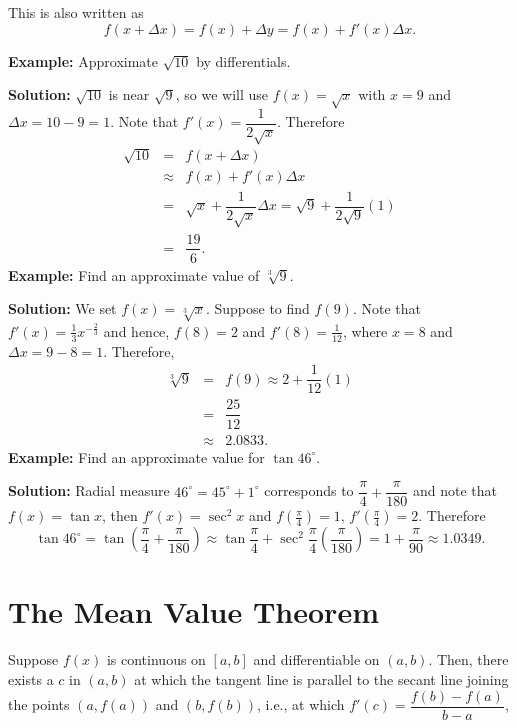 \documentclass[titlepage,a4paper,12pt]{report}
\begin{document}
\noindent This is also written as 
\begin{equation*}
f(x+\Delta x)=f(x)+\Delta y =f(x)+f'(x)\Delta x.
\end{equation*}

\noindent \textbf{Example:} Approximate $\sqrt{10}$ by differentials.

\noindent \textbf{Solution:} $\sqrt{10}$ is near $\sqrt{9}$, so we will use $f(x)=\sqrt{x}$ with $x=9$ and $\Delta x =10-9=1$. Note that $f'(x)=\dfrac{1}{2\sqrt{x}}$. Therefore
\begin{eqnarray*}
\sqrt{10} &=& f(x+\Delta x)\\
&\approx & f(x)+ f'(x)\Delta x\\
&=& \sqrt{x} +\dfrac{1}{2\sqrt{x}}\Delta x =\sqrt{9} +\dfrac{1}{2\sqrt{9}} (1)\\
&=& \dfrac{19}{6}.
\end{eqnarray*}
\noindent \textbf{Example:} Find an approximate value of $\sqrt[3]{9}$.

\noindent \textbf{Solution:} We set $f(x)=\sqrt[3]{x}$. Suppose to find $f(9)$. Note that $f'(x)=\frac{1}{3}x^{-\frac{2}{3}}$ and hence, $f(8)=2$ and $f'(8)=\frac{1}{12}$, where $x=8$ and $\Delta x =9-8=1$. Therefore, 
\begin{eqnarray*}
\sqrt[3]{9} &=& f(9) \approx 2+\dfrac{1}{12} (1)\\
&=& \dfrac{25}{12}\\
&\approx & 2.0833.
\end{eqnarray*}
 \noindent \textbf{Example:} Find an approximate value for $\tan 46^\circ$.
 
 \noindent \textbf{Solution:} Radial measure $46^\circ =45^\circ +1^\circ$ corresponds to $\dfrac{\pi}{4} +\dfrac{\pi}{180}$ and note that $f(x)=\tan x$, then $f'(x)=\sec ^2 x$ and $f(\frac{\pi}{4})=1, \, f'(\frac{\pi}{4})=2$. Therefore
 \begin{equation*}
 \tan 46^\circ = \tan \left(\dfrac{\pi}{4}+\dfrac{\pi}{180}\right) \approx \tan \frac{\pi}{4} +\sec ^2 \frac{\pi}{4} \left(\dfrac{\pi}{180}\right) = 1+\dfrac{\pi}{90} \approx 1.0349.
 \end{equation*} 
 \section{The Mean Value Theorem}
 Suppose $f(x)$ is continuous on $[a,b]$ and differentiable on $(a,b)$. Then, there exists a $c$ in $(a,b)$ at which the tangent line is parallel to the secant line joining the points $(a,f(a))$ and $(b,f(b))$, i.e., at which $f'(c)=\dfrac{f(b)-f(a)}{b-a}$, 
 
\end{document}

